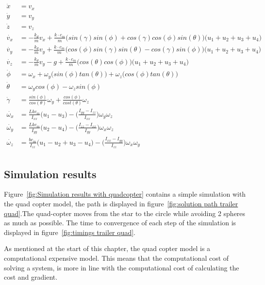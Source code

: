 \begin{equation}
	\begin{aligned}
		\dot{x} &= v_x \\
		\dot{y} &= v_y \\
		\dot{z} &= v_z \\
		\dot{v_x} &= -\frac{k_d}{m}v_x + \frac{k \cdot c_m}{m}\Big(sin(\gamma)sin(\phi)+cos(\gamma)cos(\phi)sin(\theta)\Big)\Big(u_1 + u_2 + u_3 + u_4\Big) \\
		\dot{v_y} &= -\frac{k_d}{m}v_y + \frac{k \cdot c_m}{m}\Big(cos(\phi)sin(\gamma)sin(\theta)-cos(\gamma)sin(\phi)\Big)\Big(u_1 + u_2 + u_3 + u_4\Big) \\
		\dot{v_z} &= -\frac{k_d}{m}v_y -g + \frac{k \cdot c_m}{m}\Big(cos(\theta)cos(\phi)\Big)\Big(u_1 + u_2 + u_3 + u_4\Big) \\
		\dot{\phi} &= \omega_x + \omega_y\Big( sin(\phi)tan(\theta) \Big) + \omega_z \Big( cos(\phi) tan(\theta) \Big) \\
		\dot{\theta} &= \omega_y cos(\phi) - \omega_z sin(\phi) \\
		\dot{\gamma} &= \frac{sin(\phi)}{cos(\theta)}\omega_y + \frac{cos(\phi)}{cost(\theta)} \omega_z \\
		\dot{\omega_x} &= \frac{Lkc_m}{I_{xx}}\Big( u_1 - u_3 \Big) - \Big( \frac{I_{yy}-I_{zz}}{I_{xx}} \Big) \omega_y \omega_z\\
		\dot{\omega_y} &= \frac{Lkc_m}{I_{yy}}\Big( u_2 - u_4 \Big) - \Big( \frac{I_{zz}-I_{xx}}{I_{yy}} \Big) \omega_x \omega_z\\
		\dot{\omega_z} &= \frac{bc_m}{I_{zz}}\Big( u_1 - u_2 + u_3 - u_4 \Big) - \Big( \frac{I_{xx}-I_{yy}}{I_{zz}} \Big) \omega_x \omega_y\\
	\end{aligned}
	\label{eq:mathematical model quadcopter}
\end{equation}

\subsection{Simulation results}
Figure~\ref{fig:Simulation results with quadcopter} contains a simple simulation with the quad copter model, the path is displayed in figure~\ref{fig:solution path trailer quad}.The quad-copter moves from the star to the circle while avoiding 2 spheres as much as possible. The time to convergence of each step of the simulation is displayed in figure~\ref{fig:timings trailer quad}.

As mentioned at the start of this chapter, the quad copter model is a computational expensive model. This means that the computational cost of solving a system, is more in line with the computational cost of calculating the cost and gradient.

